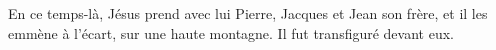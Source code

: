 En ce temps-là, Jésus prend avec lui Pierre, Jacques et Jean son frère,
	et il les emmène à l’écart, sur une haute montagne.
Il fut transfiguré devant eux.
